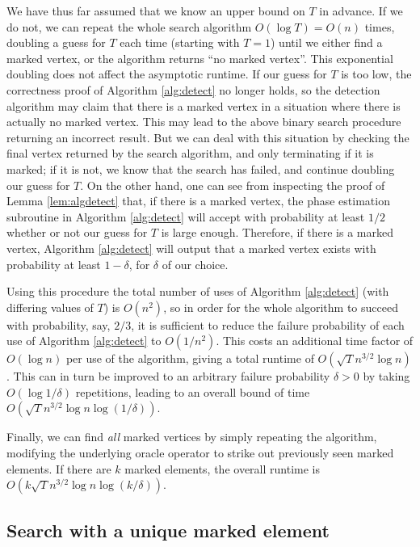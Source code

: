 \documentclass[11pt]{article}
\begin{document}
We have thus far assumed that we know an upper bound on $T$ in advance. If we do not, we can repeat the whole search algorithm $O(\log T) = O(n)$ times, doubling a guess for $T$ each time (starting with $T=1$) until we either find a marked vertex, or the algorithm returns ``no marked vertex''. This exponential doubling does not affect the asymptotic runtime. If our guess for $T$ is too low, the correctness proof of Algorithm \ref{alg:detect} no longer holds, so the detection algorithm may claim that there is a marked vertex in a situation where there is actually no marked vertex. This may lead to the above binary search procedure returning an incorrect result. But we can deal with this situation by checking the final vertex returned by the search algorithm, and only terminating if it is marked; if it is not, we know that the search has failed, and continue doubling our guess for $T$. On the other hand, one can see from inspecting the proof of Lemma \ref{lem:algdetect} that, if there is a marked vertex, the phase estimation subroutine in Algorithm \ref{alg:detect} will accept with probability at least $1/2$ whether or not our guess for $T$ is large enough. Therefore, if there is a marked vertex, Algorithm \ref{alg:detect} will output that a marked vertex exists with probability at least $1-\delta$, for $\delta$ of our choice.

Using this procedure the total number of uses of Algorithm \ref{alg:detect} (with differing values of $T$) is $O(n^2)$, so in order for the whole algorithm to succeed with probability, say, $2/3$, it is sufficient to reduce the failure probability of each use of Algorithm \ref{alg:detect} to $O(1/n^2)$. This costs an additional time factor of $O(\log n)$ per use of the algorithm, giving a total runtime of  $O(\sqrt{T} n^{3/2} \log n)$. This can in turn be improved to an arbitrary failure probability $\delta > 0$ by taking $O(\log 1/\delta)$ repetitions, leading to an overall bound of time $O(\sqrt{T} n^{3/2} \log n \log(1/\delta))$.

Finally, we can find {\em all} marked vertices by simply repeating the algorithm, modifying the underlying oracle operator to strike out previously seen marked elements. If there are $k$ marked elements, the overall runtime is $O(k \sqrt{T} n^{3/2} \log n \log(k/\delta))$.


\subsection{Search with a unique marked element}
\label{sec:uniquemarked}
\end{document}
